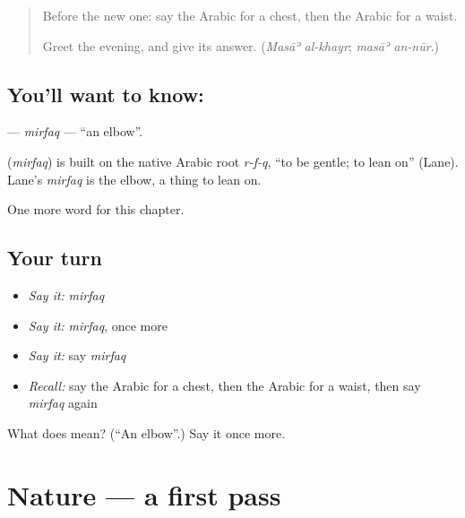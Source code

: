 \label{lesson:AR-C139-mirfaq}



\begin{quote}
Before the new one: say the Arabic for a chest, then the Arabic for a waist.

Greet the evening, and give its answer. (\emph{Masāʾ al-khayr}; \emph{masāʾ an-nūr}.)
\end{quote}

\subsection*{You'll want to know: }
\textbf{} — \emph{mirfaq} — \textquotedblleft{}an elbow\textquotedblright{}.

\begin{cousinweb}
\textbf{} (\emph{mirfaq}) is built on the native Arabic root \emph{r-f-q}, \textquotedblleft{}to be gentle; to lean on\textquotedblright{} (Lane). Lane's \emph{mirfaq} is the elbow, a thing to lean on.
\end{cousinweb}

\begin{grammarlens}[title={What you've built}]
One more word for this chapter.
\end{grammarlens}

\subsection*{Your turn}
\begin{itemize}
\raggedright
  \item \emph{Say it:} \emph{mirfaq}
  \item \emph{Say it:} \emph{mirfaq}, once more
  \item \emph{Say it:} say \emph{mirfaq}
  \item \emph{Recall:} say the Arabic for a chest, then the Arabic for a waist, then say \emph{mirfaq} again
\end{itemize}

\begin{tcolorbox}[breakable,colback=teal!4,colframe=teal!35!black,title={Before you move on}]
What does  mean? (\textquotedblleft{}An elbow\textquotedblright{}.) Say it once more.
\end{tcolorbox}
\section[(dialogue)]{Nature — a first pass}

